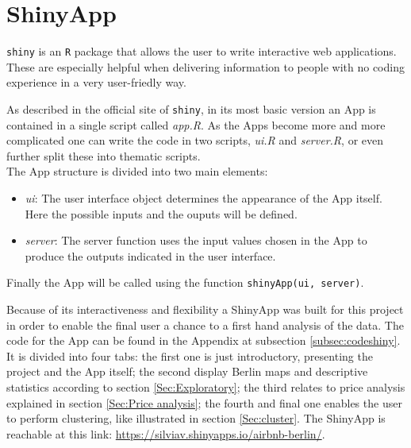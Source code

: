 \section{ShinyApp}\label{Sec:shiny}

\texttt{shiny} is an \texttt{R} package that allows the user to write interactive web applications. These are especially helpful when delivering information to people with no coding experience in a very user-friedly way.

As described in the official site of \texttt{shiny}, in its most basic version an App is contained in a single script called \textit{app.R}. As the Apps become more and more complicated one can write the code in two scripts, \textit{ui.R} and \textit{server.R}, or even further split these into thematic scripts.
\\
The App structure is divided into two main elements:
\begin{itemize}
    \item \textit{ui}: The user interface object determines the appearance of the App itself. Here the possible inputs and the ouputs will be defined.
    \item \textit{server}: The server function uses the input values chosen in the App to produce the outputs indicated in the user interface. 
\end{itemize}

Finally the App will be called using the function \texttt{shinyApp(ui, server)}.

Because of its interactiveness and flexibility a ShinyApp was built for this project in order to enable the final user a chance to a first hand analysis of the data. The code for the App can be found in the Appendix at subsection \ref{subsec:codeshiny}. It is divided into four tabs: the first one is just introductory, presenting the project and the App itself; the second display Berlin maps and descriptive statistics according to section \ref{Sec:Exploratory}; the third relates to price analysis explained in section \ref{Sec:Price analysis}; the fourth and final one enables the user to perform clustering, like illustrated in section \ref{Sec:cluster}. The ShinyApp is reachable at this link: \url{https://silviav.shinyapps.io/airbnb-berlin/}.

